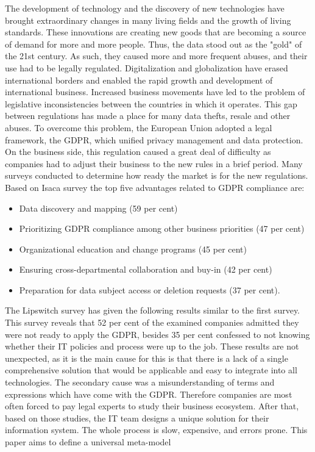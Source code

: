 \documentclass[11pt,english]{article}
\begin{document}
\quad The development of technology and the discovery of new technologies have brought extraordinary changes in many living fields and the growth of living standards. These innovations are creating new goods that are becoming a source of demand for more and more people. Thus, the data stood out as the "gold" of the 21st century. As such, they caused more and more frequent abuses, and their use had to be legally regulated. Digitalization and globalization have erased international borders and enabled the rapid growth and development of international business. Increased business movements have led to the problem of legislative inconsistencies between the countries in which it operates. This gap between regulations has made a place for many data thefts, resale and other abuses. To overcome this problem, the European Union adopted a legal framework, the GDPR, which unified privacy management and data protection. On the business side, this regulation caused a great deal of difficulty as companies had to adjust their business to the new rules in a brief period.
\newline \quad Many surveys conducted to determine how ready the market is for the new regulations. Based on Isaca survey \cite{isaca} the top five advantages related to GDPR compliance are:
\begin{itemize}
  \item Data discovery and mapping (59 per cent)
  \item Prioritizing GDPR compliance among other business priorities (47 per cent)
  \item Organizational education and change programs (45 per cent)
  \item Ensuring cross-departmental collaboration and buy-in (42 per cent)
  \item Preparation for data subject access or deletion requests (37 per cent).
\end{itemize}
\quad The Lipswitch survey \cite{lipswitch} has given the following results similar to the first survey. This survey reveals that 52 per cent of the examined companies admitted they were not ready to apply the GDPR, besides 35 per cent confessed to not knowing whether their IT policies and process were up to the job. These results are not unexpected, as it is the main cause for this is that there is a lack of a single comprehensive solution that would be applicable and easy to integrate into all technologies. The secondary cause was a misunderstanding of terms and expressions which have come with the GDPR. Therefore companies are most often forced to pay legal experts to study their business ecosystem. After that, based on those studies, the IT team designs a unique solution for their information system. The whole process is slow, expensive, and errors prone. \newline This paper aims to define a universal meta-model 
\end{document}
